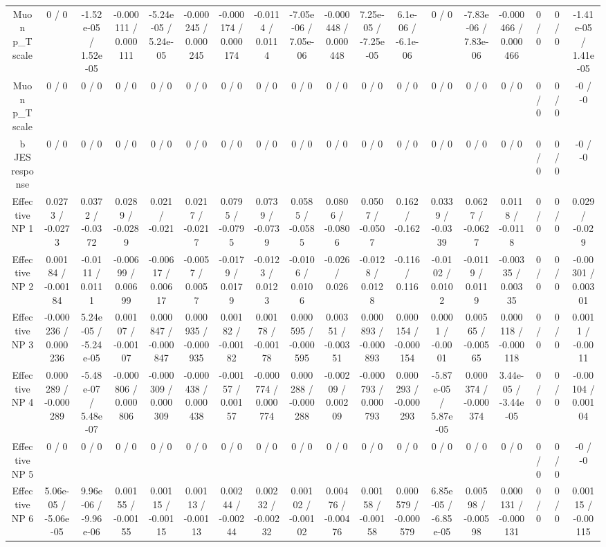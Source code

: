 \documentclass[10pt]{article}
\begin{document}
\begin{table}[htbp]
\begin{center}
\begin{tabular}{|c|c|c|c|c|c|c|c|c|c|c|c|c|c|c|c|c|c|}
  Muon p_{T} scale & 0 / 0 & -1.52e-05 / 1.52e-05 & -0.000111 / 0.000111 & -5.24e-05 / 5.24e-05 & -0.000245 / 0.000245 & -0.000174 / 0.000174 & -0.0114 / 0.0114 & -7.05e-06 / 7.05e-06 & -0.000448 / 0.000448 & 7.25e-05 / -7.25e-05 & 6.1e-06 / -6.1e-06 & 0 / 0 & -7.83e-06 / 7.83e-06 & -0.000466 / 0.000466 & 0 / 0 & 0 / 0 & -1.41e-05 / 1.41e-05 \\ 
  Muon p_{T} scale & 0 / 0 & 0 / 0 & 0 / 0 & 0 / 0 & 0 / 0 & 0 / 0 & 0 / 0 & 0 / 0 & 0 / 0 & 0 / 0 & 0 / 0 & 0 / 0 & 0 / 0 & 0 / 0 & 0 / 0 & 0 / 0 & -0 / -0 \\ 
  b JES response & 0 / 0 & 0 / 0 & 0 / 0 & 0 / 0 & 0 / 0 & 0 / 0 & 0 / 0 & 0 / 0 & 0 / 0 & 0 / 0 & 0 / 0 & 0 / 0 & 0 / 0 & 0 / 0 & 0 / 0 & 0 / 0 & -0 / -0 \\ 
  Effective NP 1 & 0.0273 / -0.0273 & 0.0372 / -0.0372 & 0.0289 / -0.0289 & 0.021 / -0.021 & 0.0217 / -0.0217 & 0.0795 / -0.0795 & 0.0739 / -0.0739 & 0.0585 / -0.0585 & 0.0806 / -0.0806 & 0.0507 / -0.0507 & 0.162 / -0.162 & 0.0339 / -0.0339 & 0.0627 / -0.0627 & 0.0118 / -0.0118 & 0 / 0 & 0 / 0 & 0.029 / -0.029 \\ 
  Effective NP 2 & 0.00184 / -0.00184 & -0.0111 / 0.0111 & -0.00699 / 0.00699 & -0.00617 / 0.00617 & -0.0057 / 0.0057 & -0.0179 / 0.0179 & -0.0123 / 0.0123 & -0.0106 / 0.0106 & -0.026 / 0.026 & -0.0128 / 0.0128 & -0.116 / 0.116 & -0.0102 / 0.0102 & -0.0119 / 0.0119 & -0.00335 / 0.00335 & 0 / 0 & 0 / 0 & -0.00301 / 0.00301 \\ 
  Effective NP 3 & -0.000236 / 0.000236 & 5.24e-05 / -5.24e-05 & 0.00107 / -0.00107 & 0.000847 / -0.000847 & 0.000935 / -0.000935 & 0.00182 / -0.00182 & 0.00178 / -0.00178 & 0.000595 / -0.000595 & 0.00351 / -0.00351 & 0.000893 / -0.000893 & 0.000154 / -0.000154 & 0.0001 / -0.0001 & 0.00565 / -0.00565 & 0.000118 / -0.000118 & 0 / 0 & 0 / 0 & 0.0011 / -0.0011 \\ 
  Effective NP 4 & 0.000289 / -0.000289 & -5.48e-07 / 5.48e-07 & -0.000806 / 0.000806 & -0.000309 / 0.000309 & -0.000438 / 0.000438 & -0.00157 / 0.00157 & -0.000774 / 0.000774 & 0.000288 / -0.000288 & -0.00209 / 0.00209 & -0.000793 / 0.000793 & 0.000293 / -0.000293 & -5.87e-05 / 5.87e-05 & 0.000374 / -0.000374 & 3.44e-05 / -3.44e-05 & 0 / 0 & 0 / 0 & -0.00104 / 0.00104 \\ 
  Effective NP 5 & 0 / 0 & 0 / 0 & 0 / 0 & 0 / 0 & 0 / 0 & 0 / 0 & 0 / 0 & 0 / 0 & 0 / 0 & 0 / 0 & 0 / 0 & 0 / 0 & 0 / 0 & 0 / 0 & 0 / 0 & 0 / 0 & -0 / -0 \\ 
  Effective NP 6 & 5.06e-05 / -5.06e-05 & 9.96e-06 / -9.96e-06 & 0.00155 / -0.00155 & 0.00115 / -0.00115 & 0.00113 / -0.00113 & 0.00244 / -0.00244 & 0.00232 / -0.00232 & 0.00102 / -0.00102 & 0.00476 / -0.00476 & 0.00158 / -0.00158 & 0.000579 / -0.000579 & 6.85e-05 / -6.85e-05 & 0.00598 / -0.00598 & 0.000131 / -0.000131 & 0 / 0 & 0 / 0 & 0.00115 / -0.00115 \\ 

\end{tabular}
\end{center}
\end{table}
\end{document}
